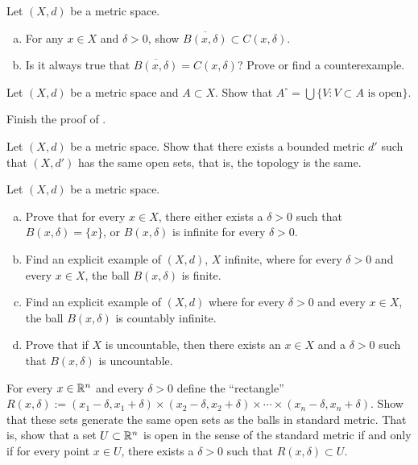 \begin{exercise}
Let $(X,d)$ be a metric space.
\begin{enumerate}[a)]
\item
For any $x \in X$ and $\delta > 0$, show
$\overline{B(x,\delta)} \subset C(x,\delta)$.
\item
Is it always true that
$\overline{B(x,\delta)} = C(x,\delta)$?  Prove or find a counterexample.
\end{enumerate}
\end{exercise}

\begin{exercise}
Let $(X,d)$ be a metric space and $A \subset X$.  Show that
$A^\circ = \bigcup \{ V : V \subset A \text{ is open} \}$.
\end{exercise}

\begin{exercise}
Finish the proof of .
\end{exercise}

\begin{exercise}
Let $(X,d)$ be a metric space.  Show that there exists a bounded metric
$d'$ such that $(X,d')$ has the same open sets, that is, the topology is
the same.
\end{exercise}

\begin{samepage}
\begin{exercise}
Let $(X,d)$ be a metric space.
\begin{enumerate}[a)]
\item
Prove that for every $x \in X$, there either exists a $\delta > 0$ such that
$B(x,\delta) = \{ x \}$, or $B(x,\delta)$ is infinite for every $\delta >  0$.
\item
Find an explicit example of $(X,d)$, $X$ infinite, where
for every $\delta > 0$ and
every $x \in X$, the
ball $B(x,\delta)$ is finite.
\item
Find an explicit example of $(X,d)$ where for every $\delta > 0$ and
every $x \in X$, the
ball $B(x,\delta)$ is countably infinite.
\item
Prove that if $X$ is uncountable, then there exists
an $x \in X$ and a $\delta > 0$ such that $B(x,\delta)$ is uncountable.
\end{enumerate}
\end{exercise}
\end{samepage}

\begin{exercise}
For every $x \in {\mathbb{R}}^n$ and every $\delta > 0$ define the ``rectangle''
$R(x,\delta) :=
(x_1-\delta,x_1+\delta) \times
(x_2-\delta,x_2+\delta) \times \cdots \times
(x_n-\delta,x_n+\delta)$.  Show that these sets generate the same open
sets as the balls in standard metric.  That is, show that a set $U \subset {\mathbb{R}}^n$
is open in the sense of the standard metric if and only if for every
point $x \in U$, there exists a $\delta > 0$ such that $R(x,\delta) \subset
U$.
\end{exercise}


